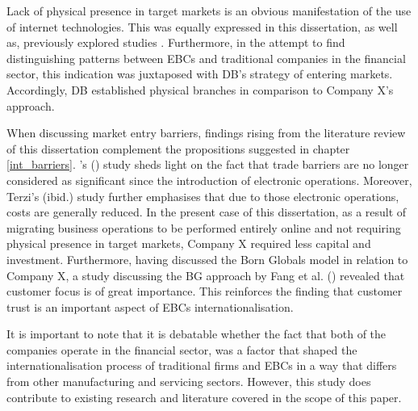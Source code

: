 \documentclass[11pt,a4paper]{article}
\begin{document}
{{{Lack of physical presence in target markets is an obvious manifestation of the use of internet technologies. This was equally expressed in this dissertation, as well as, previously explored studies \parencite{loaneCrossnationalComparisonInternationalisation2002}. Furthermore, in the attempt to find distinguishing patterns between EBCs and traditional companies in the financial sector, this indication was juxtaposed with DB's strategy of entering markets. Accordingly, DB established physical branches in comparison to Company X's approach. \par
When discussing market entry barriers, findings rising from the literature review of this dissertation complement the propositions suggested in chapter \ref{int_barriers}. \citeauthor{terziImpactEcommerceInternational2011}'s (\citeyear{terziImpactEcommerceInternational2011}) study sheds light on the fact that trade barriers are no longer considered as significant since the introduction of electronic operations. Moreover, Terzi's (ibid.) study further emphasises that due to those electronic operations, costs are generally reduced. In the present case of this dissertation, as a result of migrating business operations to be performed entirely online and not requiring physical presence in target markets, Company X required less capital and investment. Furthermore, having discussed the Born Globals model 
in relation to Company X, a study discussing the BG approach by Fang et al. (\citeyear{fangParachutingInternationalizationStudy2017}) revealed that customer focus is of great importance. This reinforces the finding that customer trust is an important aspect of EBCs internationalisation. \par
It is important to note that it is debatable whether the fact that both of the companies operate in the financial sector, was a factor that shaped the internationalisation process of traditional firms and EBCs in a way that differs from other manufacturing and servicing sectors. However, this study does contribute to existing research and literature covered in the scope of this paper.

\newpage
}}}
\end{document}

